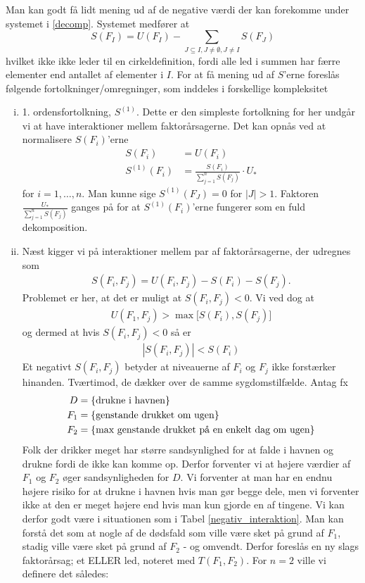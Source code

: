 \documentclass[a4paper, 12pt]{memoir}
\begin{document}
Man kan godt få lidt mening ud af de negative værdi der kan forekomme under systemet i \eqref{decomp}. Systemet medfører at
\begin{equation}
S(F_I)=U(F_I)-\sum_{J\subseteq I, J\neq \emptyset, J\neq I}S(F_J)\label{base_decomposition}
\end{equation}
hvilket ikke ikke leder til en cirkeldefinition, fordi alle led i summen har færre elementer end antallet af elementer i $I$. For at få mening ud af $S$'erne foreslås følgende fortolkninger/omregninger, som inddeles i forskellige kompleksitet
\begin{enumerate}[(i)]
\item
1. ordensfortolkning, $S^{(1)}$. Dette er den simpleste fortolkning for her undgår vi at have interaktioner mellem faktorårsagerne. Det kan opnås ved at normalisere $S(F_i)$'erne
\begin{align*}
S(F_i)&=U(F_i)\\
S^{(1)}(F_i)&=\frac{S(F_i)}{\sum_{j=1}^{n}S(F_j)}\cdot U_*
\end{align*}
for $i=1,\dots, n$. Man kunne sige $S^{(1)}(F_J)=0$ for $|J|>1$. Faktoren $\tfrac{U_*}{\sum_{j=1}^{n}S(F_j)}$ ganges på for at $S^{(1)}(F_i)$'erne fungerer som en fuld dekomposition.
\item
Næst kigger vi på interaktioner mellem par af faktorårsagerne, der udregnes som
\begin{align*}
S(F_i, F_j)=U(F_i,F_j)- S(F_i)-S(F_j).
\end{align*}
Problemet er her, at det er muligt at $S(F_i, F_j)<0$. Vi ved dog at 
\begin{gather}
U(F_1,F_j)>\max \bigl[S(F_i), S(F_j)\bigr]\label{s_bound}
\end{gather}
og dermed at hvis $S(F_i,F_j)<0$ så er 
\begin{gather}
|S(F_i,F_j)|<S(F_i) \label{s_bound2}
\end{gather}
Et negativt $S(F_i,F_j)$ betyder at niveauerne af $F_i$ og $F_j$ ikke forstærker hinanden. Tværtimod, de dækker over de samme sygdomstilfælde. Antag fx 
\begin{align*}
D&=\{\textup{drukne i havnen}\}\\
F_1&=\{\textup{genstande drukket om ugen}\}\\
F_2&=\{\textup{max genstande drukket på en enkelt dag om ugen}\}
\end{align*}
Folk der drikker meget har større sandsynlighed for at falde i havnen og drukne fordi de ikke kan komme op. Derfor forventer vi at højere værdier af $F_1$ og $F_2$ øger sandsynligheden for $D$. Vi forventer at man har en endnu højere risiko for at drukne i havnen hvis man gør begge dele, men vi forventer ikke at den er meget højere end hvis man kun gjorde en af tingene. Vi kan derfor godt være i situationen som i Tabel \ref{negativ_interaktion}. Man kan forstå det som at nogle af de dødsfald som ville være sket på grund af $F_1$, stadig ville være sket på grund af $F_2$ - og omvendt. Derfor foreslås en ny slags faktorårsag; et ELLER led, noteret med $T(F_1,F_2)$. For $n=2$ ville vi definere det således:

\end{enumerate}
\end{document}
